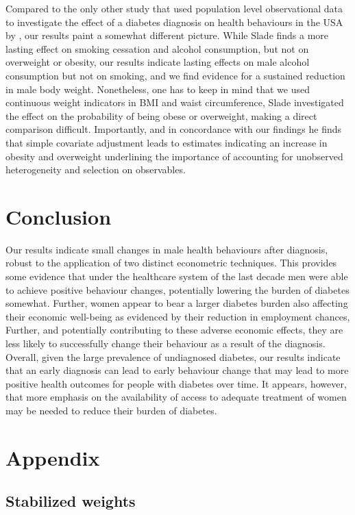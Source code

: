 Compared to the only other study that used population level observational data to investigate the effect of a diabetes diagnosis on health behaviours in the \ac{USA} by \textcite{Slade2012}\autocite{Slade2012}, our results paint a somewhat different picture. While Slade finds a more lasting effect on smoking cessation and alcohol consumption, but not on overweight or obesity, our results indicate lasting effects on male alcohol consumption but not on smoking, and we find evidence for a sustained reduction in male body weight. Nonetheless, one has to keep in mind that we used continuous weight indicators in \ac{BMI} and waist circumference, Slade investigated the effect on the probability of being obese or overweight, making a direct comparison difficult. Importantly, and in concordance with our findings he finds that simple covariate adjustment leads to estimates indicating an increase in obesity and overweight underlining the importance of accounting for unobserved heterogeneity and selection on observables.

\section*{Conclusion}

Our results indicate small changes in male health behaviours after diagnosis, robust to the application of two distinct econometric techniques. This provides some evidence that under the healthcare system of the last decade men were able to achieve positive behaviour changes, potentially lowering the burden of diabetes somewhat. Further, women appear to bear a larger diabetes burden also affecting their economic well-being as evidenced by their reduction in employment chances, Further, and potentially contributing to these adverse economic effects, they are less likely to successfully change their behaviour as a result of the diagnosis. Overall, given the large prevalence of undiagnosed diabetes, our results indicate that an early diagnosis can lead to early behaviour change that may lead to more positive health outcomes for people with diabetes over time. It appears, however, that more emphasis on the availability of access to adequate treatment of women may be needed to reduce their burden of diabetes.

\section*{\label{sec:Appendix}Appendix}

\subsection*{Stabilized weights}

